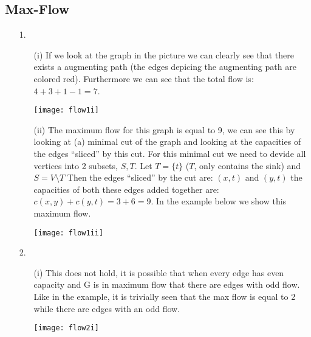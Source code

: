 \documentclass{article}
\begin{document}
\subsection*{Max-Flow}
\begin{itemize}
\item[1.]
\begin{itemize}
\item[(i)] If we look at the graph in the picture we can clearly see that there exists a augmenting path (the edges depicing the augmenting path are colored red). Furthermore we can see that the total flow is: $4+3+1-1=7$.

\texttt{[image: flow1i]}

\item[(ii)] The maximum flow for this graph is equal to 9, we can see this by looking at (a) minimal cut of the graph and looking at the capacities of the edges ``sliced'' by this cut. For this minimal cut we need to devide all vertices into 2 subsets, $S,T$. Let $T=\{t\}$ ($T$, only contains the sink) and $S=V\setminus T$ Then the edges ``sliced'' by the cut are: $(x,t)\text{ and }(y,t)$ the capacities of both these edges added together are: $c(x,y)+c(y,t)=3+6=9$. In the example below we show this maximum flow.

\centerline{\texttt{[image: flow1ii]}}
\end{itemize}

\item[2.] 
\begin{itemize}
\item[(i)] This does not hold, it is possible that when every edge has even capacity and G is in maximum flow that there are edges with odd flow. Like in the example, it is trivially seen that the max flow is equal to 2 while there are edges with an odd flow.

\texttt{[image: flow2i]}


\end{itemize}
\end{itemize}
\end{document}
